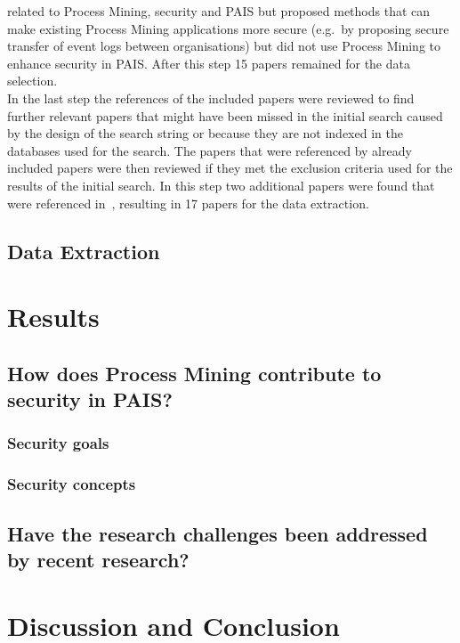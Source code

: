 \documentclass[runningheads]{llncs}
\begin{document}
related to Process Mining, security and PAIS but proposed methods that can make existing Process Mining applications more secure (e.g.\ by proposing secure transfer of event logs between organisations) but did not use Process Mining to enhance security in PAIS. After this step 15 papers
remained for the data selection.\\
In the last step the references of the included papers were reviewed to find further relevant papers that might have been missed in the initial search caused by the design of the search string or because they are not indexed in the databases used for the search.
The papers that were referenced by already included papers were then reviewed if they met the exclusion criteria used for the results of the initial search. In this step two additional papers were found that were referenced in~\cite{Silalahi20221}, resulting in 17
papers for the data extraction.
\subsection{Data Extraction}\label{Extraction}

\section{Results}\label{Results}
\subsection{How does Process Mining contribute to security in PAIS?}\label{Q1}
\subsubsection{Security goals}\label{goals}
\subsubsection{Security concepts}\label{concepts}
\subsection{Have the research challenges been addressed by recent research?}\label{Q2}

\section{Discussion and Conclusion}\label{Conclusion}

%
%
% 
% 
%

{}
\end{document}
